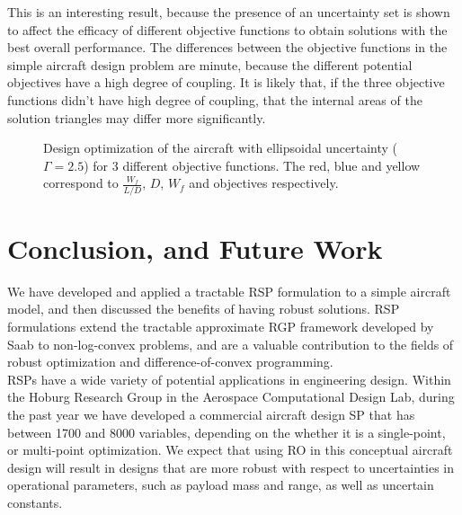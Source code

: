 \documentclass{article}
\begin{document}
{This is an interesting result, because the presence of an uncertainty set is shown to affect the efficacy of different objective functions to obtain solutions with the best overall performance. The differences between the objective functions in the simple aircraft design problem are minute, because the different potential objectives have a high degree of coupling. It is likely that, if the three objective functions didn't have high degree of coupling, that the internal areas of the solution triangles may differ more significantly. 

\begin{figure}[H]
\caption{Design optimization of the aircraft with ellipsoidal uncertainty ($\Gamma = 2.5$) for 3 different objective functions. The red, blue and yellow correspond to $\frac{W_f}{L/D}$, $D$, $W_f$ and objectives respectively.}
\begin{center}
\end{center}
\end{figure}


\section{Conclusion, and Future Work}

We have developed and applied a tractable RSP formulation to a simple aircraft model, and then discussed the benefits of having robust solutions. RSP formulations extend the tractable approximate RGP framework developed by Saab to non-log-convex problems, and are a valuable contribution to the fields of robust optimization and difference-of-convex programming.\\

RSPs have a wide variety of potential applications in engineering design. Within the Hoburg Research Group in the Aerospace Computational Design Lab, during the past year we have developed a commercial aircraft design SP that has between 1700 and 8000 variables, depending on the whether it is a single-point, or multi-point optimization. We expect that using RO in this conceptual aircraft design will result in designs that are more robust with respect to uncertainties in operational parameters, such as payload mass and range, as well as uncertain constants.

}
\end{document}
